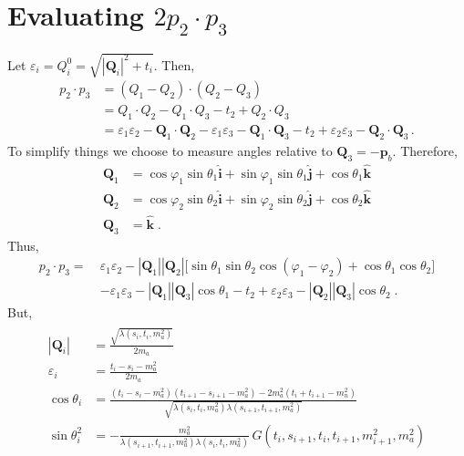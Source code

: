 \section{Evaluating $2 p_2 \cdot p_3$}
\newcommand{\Qvec}[1]{\bm{Q}_{#1}}
\newcommand{\Qmag}[1]{|\bm{Q}_{#1}|}
\label{app:2-dot-3}
Let $\varepsilon_i = Q_i^0 = \sqrt{\Qmag{i}^2 + t_i}$. Then,
\begin{equation}
    \begin{aligned}
        p_2 \cdot p_3 
        &=
            (Q_1 - Q_2)\cdot(Q_2 - Q_3)     \\
        &=
            Q_1 \cdot Q_2 - Q_1 \cdot Q_3 - t_2 + Q_2 \cdot Q_3 \\
        &= 
            \varepsilon_1 \varepsilon_2 - \Qvec{1}\cdot\Qvec{2}
        -
            \varepsilon_1 \varepsilon_3 - \Qvec{1}\cdot\Qvec{3}
        -
            t_2
        +
        \varepsilon_2 \varepsilon_3 - \Qvec{2}\cdot\Qvec{3} \, . 
    \end{aligned}
\end{equation}
To simplify things we choose to measure angles relative to $\Qvec{3} = -\bm{p}_b$. Therefore, 
\begin{align}
    \Qvec{1} &= \cos \varphi_1 \sin \theta_1 \hat{\bm{i}} + \sin \varphi_1 \sin \theta_1 \hat{\bm{j}} + \cos \theta_1 \hat{\bm{k}} \\
    \Qvec{2} &= \cos \varphi_2 \sin \theta_2 \hat{\bm{i}} + \sin \varphi_2 \sin \theta_2 \hat{\bm{j}} + \cos \theta_2 \hat{\bm{k}} \\
    \Qvec{3} &= \hat{\bm{k}} \; .
\end{align}
Thus,
\begin{align}
    p_2 \cdot p_3 
    =\  
        &\varepsilon_1 \varepsilon_2 - \Qmag{1}\Qmag{2} 
        \big[
            \sin \theta_1 \sin \theta_2 \cos(\varphi_1 - \varphi_2) + \cos\theta_1 \cos\theta_2
        \big]\\
    &-
        \varepsilon_1 \varepsilon_3 - \Qmag{1}\Qmag{3} \cos \theta_1
    -
        t_2
    +
    \varepsilon_2 \varepsilon_3 - \Qmag{2}\Qmag{3} \cos \theta_2 \; .
\end{align}
But, 
\begin{gather}
    \begin{aligned}
        \Qmag{i} &= \frac{\sqrt{\lambda(s_i, t_i, m_a^2)}}{2 m_a} \\
        \varepsilon_i &= \frac{t_i - s_i - m_a^2}{2 m_a} \\
        \cos \theta_i & = 
            \frac
                {
                    (t_i - s_i - m_a^2)(t_{i+1} - s_{i+1} - m_a^2) - 2m_a^2(t_i + t_{i+1} - m_n^2)
                }
                {
                    \sqrt{
                        \lambda(s_i, t_i, m_a^2) \lambda(s_{i+1},t_{i+1}, m_a^2)
                    }
                } \\
        \sin \theta^2_i & = 
                -
                \frac
                    {
                        m_a^2
                    }
                    {
                        \lambda(s_{i+1}, t_{i+1}, m_a^2) \lambda(s_i, t_i, m_a^2)
                    } \, 
                G(t_i, s_{i+1}, t_i, t_{i+1}, m_{i+1}^2, m_a^2) 
    \end{aligned}
\end{gather}
